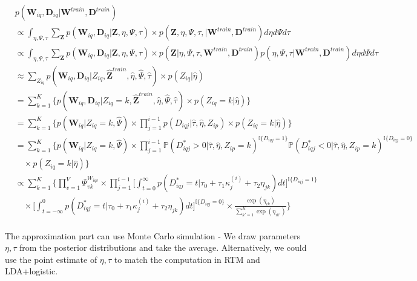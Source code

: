 \begin{equation}
\begin{split}
  &p(\mathbf{W}_{iq}, \mathbf{D}_{iq} \vert \mathbf{W}^{train}, \mathbf{D}^{train}) \\
  &\propto \int_{\eta, \Psi, \tau} \sum_{\mathbf{Z}} p(\mathbf{W}_{iq}, \mathbf{D}_{iq} \vert \mathbf{Z}, \eta, \Psi, \tau) 
  \times p(\mathbf{Z}, \eta, \Psi, \tau, \vert \mathbf{W}^{train}, \mathbf{D}^{train}) d\eta d\Psi d\tau \\
  &\propto \int_{\eta, \Psi, \tau} \sum_{\mathbf{Z}} p(\mathbf{W}_{iq}, \mathbf{D}_{iq} \vert \mathbf{Z}, \eta, \Psi, \tau) 
  \times p(\mathbf{Z} \vert \eta, \Psi, \tau, \mathbf{W}^{train}, \mathbf{D}^{train}) p( \eta, \Psi, \tau \vert \mathbf{W}^{train}, \mathbf{D}^{train}) d\eta d\Psi d\tau \\
  &\approx \sum_{Z_{iq}} p(\mathbf{W}_{iq}, \mathbf{D}_{iq} \vert Z_{iq}, \hat{\mathbf{Z}}^{train}, \hat{\eta}, \hat{\Psi}, \hat{\tau}) \times p(Z_{iq} \vert \hat{\eta})  \\
  &= \sum_{k=1}^K \Big\{ p(\mathbf{W}_{iq}, \mathbf{D}_{iq} \vert Z_{iq} = k, \hat{\mathbf{Z}}^{train}, \hat{\eta}, \hat{\Psi}, \hat{\tau}) \times p(Z_{iq} = k \vert \hat{\eta}) \Big\} \\
  &= \sum_{k=1}^K \Big\{ p(\mathbf{W}_{iq} \vert Z_{iq} = k, \hat{\Psi})
  \times \prod_{j=1}^{i-1} p(D_{iqj} \vert \hat{\tau}, \hat{\eta}, Z_{ip})
  \times p(Z_{iq} = k \vert \hat{\eta}) \Big\} \\
  &= \sum_{k=1}^K \Big\{ p(\mathbf{W}_{iq} \vert Z_{iq} = k, \hat{\Psi})
  \times \prod_{j=1}^{i-1} \mathbb{P}(D_{iqj}^* > 0 \vert \hat{\tau}, \hat{\eta}, Z_{ip} = k)^{\mathbb{I}\{D_{iqj}=1\}}\mathbb{P}(D_{iqj}^* < 0 \vert \hat{\tau}, \hat{\eta}, Z_{ip} = k)^{\mathbb{I}\{D_{iqj}=0\}} \\
  &\quad \times p(Z_{iq} = k \vert \hat{\eta}) \Big\} \\
  &\propto \sum_{k=1}^K \Bigg\{ \prod_{v=1}^V \Psi_{vk}^{W_{iqv}} 
  \times \prod_{j=1}^{i-1} \Big[\int_{t=0}^{\infty} p(D_{iqj}^* = t | \tau_0 + \tau_1 \kappa_j^{(i)} + \tau_2\eta_{jk}) dt\Big]^{\mathbb{I}\{D_{iqj}=1\}} \\
  &\quad \times \Big[\int_{t=-\infty}^{0} p(D_{iqj}^* = t | \tau_0 + \tau_1 \kappa_j^{(i)} + \tau_2\eta_{jk}) dt \Big]^{\mathbb{I}\{D_{iqj}=0\}} 
  \times \frac{\exp(\eta_{ik})}{\sum_{k'=1}^K \exp(\eta_{ik'})} \Bigg\} \\
\end{split}
\end{equation}

The approximation part can use Monte Carlo simulation - We draw parameters $\eta, \tau$ from the posterior distributions and take the average.
Alternatively, we could use the point estimate of $\eta, \tau$ to match the computation in RTM and LDA+logistic.
